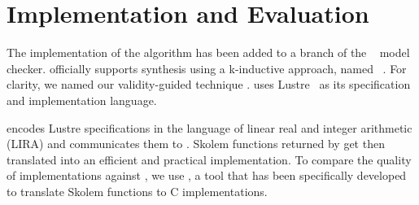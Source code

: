 \section{Implementation and Evaluation}
\label{sec:impl}

The implementation of the algorithm has been added to a branch of the  \jkind~\cite{jkind} model checker.  \jkind officially supports synthesis
using a k-inductive approach, named \jsyn~\cite{KatisFGBGW16}. For clarity, we named
our validity-guided technique \jsynvg. \jkind uses Lustre~\cite{lustrev6} as its specification and implementation language.
\iffalse
, which functions as an intermediate representation to the Architecture Analysis and Design Language (\textsc{AADL})~\cite{feiler2006architecture}.
The latter is a high-level specification and analysis language with which
contracts are expressed, using the Assume-Guarantee Reasoning (\textsc{AGREE})
framework~\cite{NFM2012:CoGaMiWhLaLu}.
\andrew{it seems strange to be talking about AADL and maybe even AGREE  at all here.}

\fi
%
\jsynvg encodes Lustre specifications in the language of
linear real and integer arithmetic (LIRA)
and communicates them to \aeval.
%
%
Skolem functions returned by \aeval get then translated %
into an efficient and practical implementation. To compare the quality of implementations against \jsyn, we use
\smtlibtoc, a tool that has been specifically developed to translate
  Skolem functions to C implementations.




